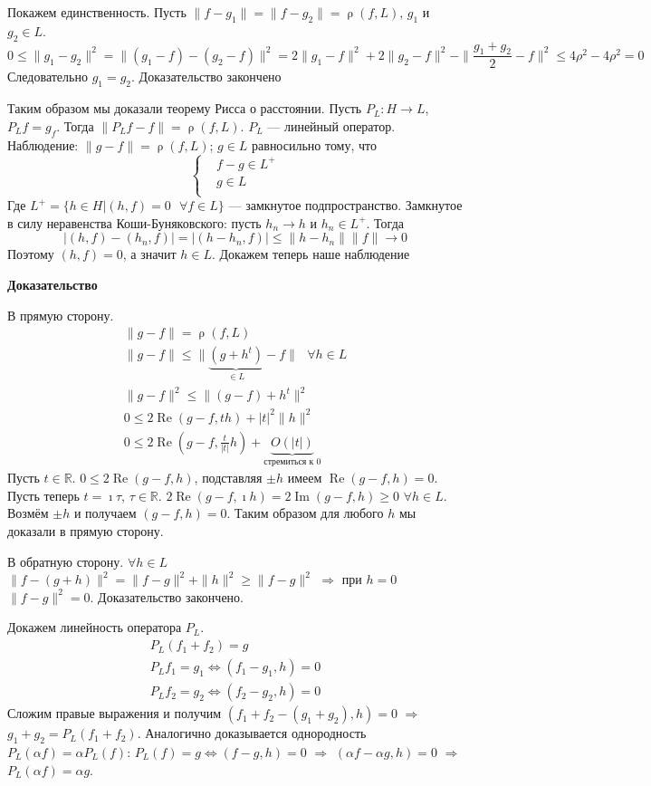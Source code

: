 \documentclass[12pt]{article}
\DeclareMathOperator{\rh}{\rho}
\DeclareMathOperator{\Ree}{Re}
\DeclareMathOperator{\Imm}{Im}
\begin{document}
Покажем единственность. Пусть $\|f-g_1\|=\|f-g_2\|=\rh(f,L)$, $g_1$ и $g_2\in L$.
$$
0\le\|g_1-g_2\|^2=\|(g_1-f)-(g_2-f)\|^2=2\|g_1-f\|^2+2\|g_2-f\|^2-\|\frac{g_1+g_2}2-f\|^2\le4\rho^2-4\rho^2=0
$$
Следовательно $g_1=g_2$. Доказательство закончено

Таким образом мы доказали теорему Рисса о расстоянии.
Пусть $P_L:H\to L$, $P_L f=g_f$.
Тогда $\|P_Lf-f\|=\rh(f,L)$. $P_L$ --- линейный оператор.
Наблюдение: $\|g-f\|=\rh(f,L)$; $g\in L$ равносильно тому, что 
$$
\left\{
\begin{aligned}
&f-g\in L^{+}\\
&g\in L\\
\end{aligned}
\right.
$$
Где $L^+=\{h\in H|(h,f)=0\text{ }\forall f\in L\}$ --- замкнутое подпространство.
Замкнутое в силу неравенства Коши-Буняковского: пусть $h_n\to h$ и $h_n\in L^+$. Тогда
$$
|(h,f)-(h_n,f)|=|(h-h_n,f)|\le\|h-h_n\|\|f\|\to 0
$$
Поэтому $(h,f)=0$, а значит $h\in L$.
Докажем теперь наше наблюдение

\textbf{Доказательство}

В прямую сторону.
\begin{gather*}
\|g-f\|=\rh(f,L)\\
\|g-f\|\le\|\underbrace{(g+h^t)}_{\in L}-f\|\text{ }\forall h\in L\\
\|g-f\|^2\le\|(g-f)+h^t\|^2\\
0\le2\Ree(g-f,th)+|t|^2\|h\|^2\\
0\le2\Ree(g-f,\frac{t}{|t|}h)+\underbrace{O(|t|)}_{\text{стремиться к 0}}
\end{gather*}
Пусть $t\in\mathbb R$.
$0\le2\Ree(g-f,h)$, подставляя $\pm h$ имеем $\Ree(g-f, h)=0$.
Пусть теперь $t=\imath \tau$, $\tau \in \mathbb R$.
$2\Ree(g-f,\imath h)=2\Imm(g-f,h)\ge0$ $\forall h\in L$.
Возмём $\pm h$ и получаем $(g-f,h)=0$. Таким образом для любого $h$ мы доказали в прямую сторону.

В обратную сторону.
$\forall h\in L$ $\|f-(g+h)\|^2=\|f-g\|^2+\|h\|^2\ge\|f-g\|^2$ $\Rightarrow$ при $h=0$ $\|f-g\|^2=0$.
Доказательство закончено.

Докажем линейность оператора $P_L$.
\begin{gather*}
P_L(f_1+f_2)=g\\
P_Lf_1=g_1\Leftrightarrow(f_1-g_1,h)=0\\
P_Lf_2=g_2\Leftrightarrow(f_2-g_2,h)=0
\end{gather*}
Сложим правые выражения и получим $(f_1+f_2-(g_1+g_2),h)=0$ $\Rightarrow$ $g_1+g_2=P_L(f_1+f_2)$.
Аналогично доказывается однородность $P_L(\alpha f)=\alpha P_L(f)$: $P_L(f)=g\Leftrightarrow(f-g,h)=0$ $\Rightarrow$ $(\alpha f- \alpha g,h)=0$ $\Rightarrow$ $P_L(\alpha f)=\alpha g$.
\end{document}
